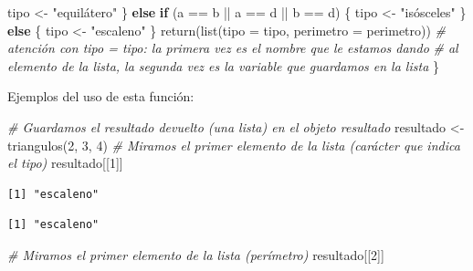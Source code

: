 \documentclass[
]{book}
\newenvironment{Shaded}{\begin{snugshade}}{\end{snugshade}}
\newcommand{\AttributeTok}[1]{\textcolor[rgb]{0.77,0.63,0.00}{#1}}
\newcommand{\CommentTok}[1]{\textcolor[rgb]{0.56,0.35,0.01}{\textit{#1}}}
\newcommand{\ControlFlowTok}[1]{\textcolor[rgb]{0.13,0.29,0.53}{\textbf{#1}}}
\newcommand{\DecValTok}[1]{\textcolor[rgb]{0.00,0.00,0.81}{#1}}
\newcommand{\FunctionTok}[1]{\textcolor[rgb]{0.00,0.00,0.00}{#1}}
\newcommand{\NormalTok}[1]{#1}
\newcommand{\OtherTok}[1]{\textcolor[rgb]{0.56,0.35,0.01}{#1}}
\newcommand{\SpecialCharTok}[1]{\textcolor[rgb]{0.00,0.00,0.00}{#1}}
\newcommand{\StringTok}[1]{\textcolor[rgb]{0.31,0.60,0.02}{#1}}
\begin{document}
\begin{Shaded}
\begin{Highlighting}[]
\NormalTok{        tipo }\OtherTok{\textless{}{-}} \StringTok{"equilátero"}
\NormalTok{    \} }\ControlFlowTok{else} \ControlFlowTok{if}\NormalTok{ (a }\SpecialCharTok{==}\NormalTok{ b }\SpecialCharTok{||}\NormalTok{ a }\SpecialCharTok{==}\NormalTok{ d }\SpecialCharTok{||}\NormalTok{ b }\SpecialCharTok{==}\NormalTok{ d) \{}
\NormalTok{        tipo }\OtherTok{\textless{}{-}} \StringTok{"isósceles"}
\NormalTok{    \} }\ControlFlowTok{else}\NormalTok{ \{}
\NormalTok{        tipo }\OtherTok{\textless{}{-}} \StringTok{"escaleno"}
\NormalTok{    \}}
    \FunctionTok{return}\NormalTok{(}\FunctionTok{list}\NormalTok{(}\AttributeTok{tipo =}\NormalTok{ tipo, }\AttributeTok{perimetro =}\NormalTok{ perimetro))}
    \CommentTok{\# atención con tipo = tipo: la primera vez es el nombre que le estamos dando}
    \CommentTok{\# al elemento de la lista, la segunda vez es la variable que guardamos en la lista}
\NormalTok{\}}
\end{Highlighting}
\end{Shaded}

Ejemplos del uso de esta función:

\begin{Shaded}
\begin{Highlighting}[]
\CommentTok{\# Guardamos el resultado devuelto (una lista) en el objeto resultado}
\NormalTok{resultado }\OtherTok{\textless{}{-}} \FunctionTok{triangulos}\NormalTok{(}\DecValTok{2}\NormalTok{, }\DecValTok{3}\NormalTok{, }\DecValTok{4}\NormalTok{)}
\CommentTok{\# Miramos el primer elemento de la lista (carácter que indica el tipo)}
\NormalTok{resultado[[}\DecValTok{1}\NormalTok{]]}
\end{Highlighting}
\end{Shaded}

\begin{verbatim}
[1] "escaleno"
\end{verbatim}

\begin{Shaded}
\end{Shaded}

\begin{verbatim}
[1] "escaleno"
\end{verbatim}

\begin{Shaded}
\begin{Highlighting}[]
\CommentTok{\# Miramos el primer elemento de la lista (perímetro)}
\NormalTok{resultado[[}\DecValTok{2}\NormalTok{]]}
\end{Highlighting}
\end{Shaded}
\end{document}
